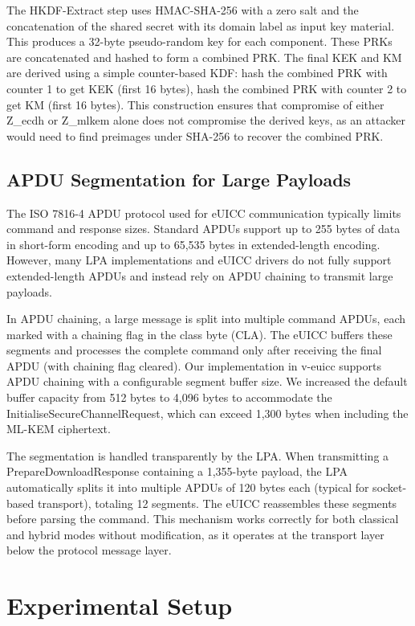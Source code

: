 \documentclass{easychair}
\begin{document}
The HKDF-Extract step uses HMAC-SHA-256 with a zero salt and the concatenation of the shared secret with its domain label as input key material. This produces a 32-byte pseudo-random key for each component. These PRKs are concatenated and hashed to form a combined PRK. The final KEK and KM are derived using a simple counter-based KDF: hash the combined PRK with counter 1 to get KEK (first 16 bytes), hash the combined PRK with counter 2 to get KM (first 16 bytes). This construction ensures that compromise of either Z\_ecdh or Z\_mlkem alone does not compromise the derived keys, as an attacker would need to find preimages under SHA-256 to recover the combined PRK.

\subsection{APDU Segmentation for Large Payloads}

The ISO 7816-4 APDU protocol used for eUICC communication typically limits command and response sizes. Standard APDUs support up to 255 bytes of data in short-form encoding and up to 65,535 bytes in extended-length encoding. However, many LPA implementations and eUICC drivers do not fully support extended-length APDUs and instead rely on APDU chaining to transmit large payloads.

In APDU chaining, a large message is split into multiple command APDUs, each marked with a chaining flag in the class byte (CLA). The eUICC buffers these segments and processes the complete command only after receiving the final APDU (with chaining flag cleared). Our implementation in v-euicc supports APDU chaining with a configurable segment buffer size. We increased the default buffer capacity from 512 bytes to 4,096 bytes to accommodate the InitialiseSecureChannelRequest, which can exceed 1,300 bytes when including the ML-KEM ciphertext.

The segmentation is handled transparently by the LPA. When transmitting a PrepareDownloadResponse containing a 1,355-byte payload, the LPA automatically splits it into multiple APDUs of 120 bytes each (typical for socket-based transport), totaling 12 segments. The eUICC reassembles these segments before parsing the command. This mechanism works correctly for both classical and hybrid modes without modification, as it operates at the transport layer below the protocol message layer.

\section{Experimental Setup}
\end{document}
